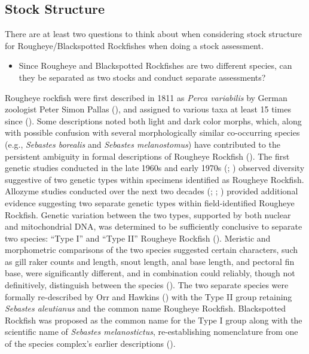 \documentclass[
]{scrartcl}
\providecommand{\tightlist}{%
  \setlength{\itemsep}{0pt}\setlength{\parskip}{0pt}}\usepackage{longtable,booktabs,array}
\begin{document}
\subsection{Stock Structure}\label{stock-structure}

There are at least two questions to think about when considering stock
structure for Rougheye/Blackspotted Rockfishes when doing a stock
assessment.

\begin{itemize}
\tightlist
\item
  Since Rougheye and Blackspotted Rockfishes are two different species,
  can they be separated as two stocks and conduct separate assessments?
\end{itemize}

Rougheye rockfish were first described in 1811 as \emph{Perca
variabilis} by German zoologist Peter Simon Pallas
(), and
assigned to various taxa at least 15 times since
(). Some descriptions noted both light and dark color morphs, which,
along with possible confusion with several morphologically similar
co-occurring species (e.g., \emph{Sebastes borealis} and \emph{Sebastes
melanostomus}) have contributed to the persistent ambiguity in formal
descriptions of Rougheye Rockfish (). The first genetic studies conducted in the late
1960s and early 1970s (; ) observed diversity suggestive of two genetic types within
specimens identified as Rougheye Rockfish. Allozyme studies conducted
over the next two decades (; ; )
provided additional evidence suggesting two separate genetic types
within field-identified Rougheye Rockfish. Genetic variation between the
two types, supported by both nuclear and mitochondrial DNA, was
determined to be sufficiently conclusive to separate two species: ``Type
I'' and ``Type II'' Rougheye Rockfish
().
Meristic and morphometric comparisons of the two species suggested
certain characters, such as gill raker counts and length, snout length,
anal base length, and pectoral fin base, were significantly different,
and in combination could reliably, though not definitively, distinguish
between the species (). The two separate species were formally
re-described by Orr and Hawkins ()
with the Type II group retaining \emph{Sebastes aleutianus} and the
common name Rougheye Rockfish. Blackspotted Rockfish was proposed as the
common name for the Type I group along with the scientific name of
\emph{Sebastes melanostictus}, re-establishing nomenclature from one of
the species complex's earlier descriptions
().
\end{document}
